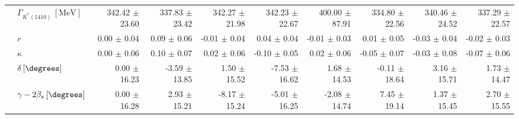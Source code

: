 \begin{tabular}{l l  r  r  r  r  r  r  r  r  }
 & $\Gamma_{K^{*}(1410)} \, [\text{MeV}]$ & 342.42 $\pm$ 23.60 & 337.83 $\pm$ 23.42 & 342.27 $\pm$ 21.98 & 342.23 $\pm$ 22.67 & 400.00 $\pm$ 87.91 & 334.80 $\pm$ 22.56 & 340.46 $\pm$ 24.52 & 337.29 $\pm$ 22.57 \\ 
 & $r$ & 0.00 $\pm$ 0.04 & 0.09 $\pm$ 0.06 & -0.01 $\pm$ 0.04 & 0.04 $\pm$ 0.04 & -0.01 $\pm$ 0.03 & 0.01 $\pm$ 0.05 & -0.03 $\pm$ 0.04 & -0.02 $\pm$ 0.03 \\ 
 & $\kappa$ & 0.00 $\pm$ 0.06 & 0.10 $\pm$ 0.07 & 0.02 $\pm$ 0.06 & -0.10 $\pm$ 0.05 & 0.02 $\pm$ 0.06 & -0.05 $\pm$ 0.07 & -0.03 $\pm$ 0.08 & -0.07 $\pm$ 0.06 \\ 
 & $\delta \, [\degrees]$ & 0.00 $\pm$ 16.23 & -3.59 $\pm$ 13.85 & 1.50 $\pm$ 15.52 & -7.53 $\pm$ 16.62 & 1.68 $\pm$ 14.53 & -0.11 $\pm$ 18.64 & 3.16 $\pm$ 15.71 & 1.73 $\pm$ 14.47 \\ 
 & $\gamma - 2 \beta_{s} \, [\degrees]$ & 0.00 $\pm$ 16.28 & 2.93 $\pm$ 15.21 & -8.17 $\pm$ 15.24 & -5.01 $\pm$ 16.25 & -2.08 $\pm$ 14.74 & 7.45 $\pm$ 19.14 & 1.37 $\pm$ 15.45 & 2.70 $\pm$ 15.55 \\ 
\hline
\hline
\end{tabular}
